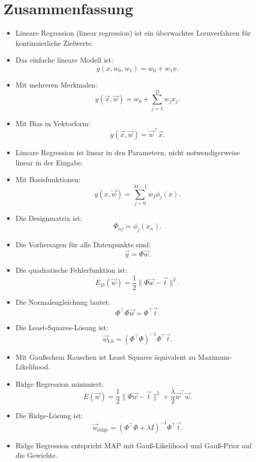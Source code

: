 \section{Zusammenfassung}

\begin{itemize}
    \item Lineare Regression (linear regression) ist ein überwachtes Lernverfahren für kontinuierliche Zielwerte.
    \item Das einfache lineare Modell ist:
    \[
        y(x,w_0,w_1)
        =
        w_0+w_1x.
    \]
    \item Mit mehreren Merkmalen:
    \[
        y(\vec{x},\vec{w})
        =
        w_0+\sum_{j=1}^{D}w_jx_j.
    \]
    \item Mit Bias in Vektorform:
    \[
        y(\vec{x},\vec{w})
        =
        \vec{w}^{\top}\vec{x}.
    \]
    \item Lineare Regression ist linear in den Parametern, nicht notwendigerweise linear in der Eingabe.
    \item Mit Basisfunktionen:
    \[
        y(x,\vec{w})
        =
        \sum_{j=0}^{M-1}
        w_j\phi_j(x).
    \]
    \item Die Designmatrix ist:
    \[
        \Phi_{nj}
        =
        \phi_j(x_n).
    \]
    \item Die Vorhersagen für alle Datenpunkte sind:
    \[
        \vec{y}
        =
        \Phi\vec{w}.
    \]
    \item Die quadratische Fehlerfunktion ist:
    \[
        E_D(\vec{w})
        =
        \frac{1}{2}
        \|\Phi\vec{w}-\vec{t}\|^2.
    \]
    \item Die Normalengleichung lautet:
    \[
        \Phi^{\top}\Phi\vec{w}
        =
        \Phi^{\top}\vec{t}.
    \]
    \item Die Least-Squares-Lösung ist:
    \[
        \vec{w}_{\mathrm{LS}}
        =
        (\Phi^{\top}\Phi)^{-1}
        \Phi^{\top}\vec{t}.
    \]
    \item Mit Gaußschem Rauschen ist Least Squares äquivalent zu Maximum-Likelihood.
    \item Ridge Regression minimiert:
    \[
        E(\vec{w})
        =
        \frac{1}{2}
        \|\Phi\vec{w}-\vec{t}\|^2
        +
        \frac{\lambda}{2}
        \vec{w}^{\top}\vec{w}.
    \]
    \item Die Ridge-Lösung ist:
    \[
        \vec{w}_{\mathrm{ridge}}
        =
        (\Phi^{\top}\Phi+\lambda I)^{-1}
        \Phi^{\top}\vec{t}.
    \]
    \item Ridge Regression entspricht MAP mit Gauß-Likelihood und Gauß-Prior auf die Gewichte.
\end{itemize}

